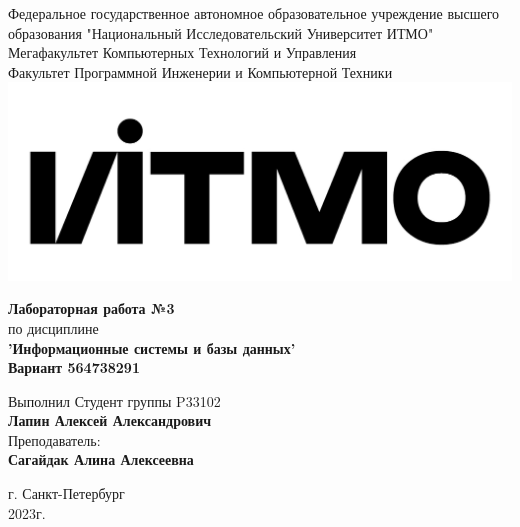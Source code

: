 \documentclass[12pt,onecolumn]{article}
\begin{document}
\setcounter{tocdepth}{4}
\begin{center}
    Федеральное государственное автономное образовательное учреждение высшего образования "Национальный Исследовательский Университет ИТМО"\\ 
    Мегафакультет Компьютерных Технологий и Управления\\
    Факультет Программной Инженерии и Компьютерной Техники \\
    \includegraphics[scale=0.3]{image/itmo.jpg} %
\end{center}
\vspace{1cm}


\begin{center}
    \textbf{Лабораторная работа №3}\\
    по дисциплине\\
    \textbf{'Информационные системы и базы данных'}\\
    \textbf{Вариант 564738291}
\end{center}

\vspace{2cm}

\begin{flushright}
  Выполнил Студент  группы P33102\\
  \textbf{Лапин Алексей Александрович}\\
  Преподаватель: \\
  \textbf{Сагайдак Алина Алексеевна}\\
\end{flushright}

\vspace{6cm}
\begin{center}
    г. Санкт-Петербург\\
    2023г.
\end{center}

\newpage
\tableofcontents
\newpage
\end{document}
